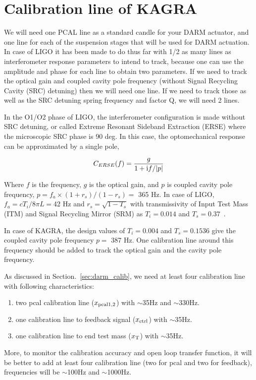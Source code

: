 \section{Calibration line of KAGRA}
We will need one PCAL line as a standard candle for your DARM actuator, and 
one line for each of the suspension stages that will be used for DARM 
actuation. In case of LIGO it has been made to do thus far with 1/2 
as many lines as interferometer response parameters to intend to track, 
because one can use the amplitude and phase for each line to obtain two 
parameters. If we need to track the optical gain and coupled cavity pole 
frequency (without Signal Recycling Cavity (SRC) detuning) then we will 
need one line. If we need to track those as well as the SRC detuning spring 
frequency and factor Q, we will need 2 lines.

In the O1/O2 phase of LIGO, the interferometer configuration is made without 
SRC detuning, or called Extreme Resonant Sideband Extraction (ERSE) 
where the microscopic SRC phase is 90 deg.
In this case, the optomechanical response can be approximated by a single pole,

\begin{equation}
C_{ERSE}(f) = \frac{g}{1+{\rm i}f/|p|}
\end{equation}

Where $f$ is the frequency, $g$ is the optical gain, and $p$ is coupled 
cavity pole frequency, $p=f_a\times(1+r_s)/(1-r_s) =$ 365 Hz.
In case of LIGO, $f_a=cT_i/8\pi L = $42 Hz and $r_s=\sqrt{1-T_s}$ 
with transmissivity of Input Test Mass (ITM) and Signal Recycling Mirror (SRM) 
as $T_i=0.014$ and $T_s=0.37$~\cite{OptSpringCal}.

In case of KAGRA, the design values of $T_i=0.004$ and $T_s=0.1536$ give 
the coupled cavity pole frequency $p=$ 387 Hz. One calibration line around 
this frequency should be added to track the optical gain and the cavity pole 
frequency.

As discussed in Section.~\ref{sec:darm_calib}, we need at least four calibration line with following characteristics:
\begin{enumerate}
\item two pcal calibration line ($x_{\rm pcal1,2}$) with $\sim$35Hz and $\sim$330Hz. 
\item one calibration line to feedback signal ($x_{\rm ctrl}$) with $\sim$35Hz.
\item one calibration line to end test mass ($x_{\rm T}$) with $\sim$35Hz.
\end{enumerate}
More, to monitor the calibration accuracy and open loop transfer function,
it will be better to add at least four calibration line (two for pcal and two for feedback), 
frequencies will be $\sim$100Hz and $\sim$1000Hz.


